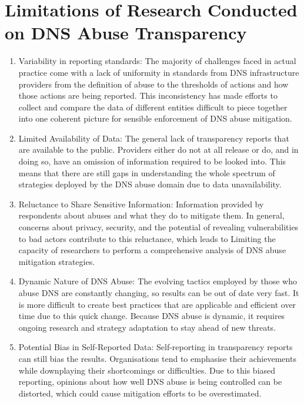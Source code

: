 \section{Limitations of Research Conducted on DNS Abuse Transparency }

\begin{enumerate}
    \item Variability in reporting standards: The majority of challenges faced in actual practice come with a lack of uniformity in standards from DNS infrastructure providers from the definition of abuse to the thresholds of actions and how those actions are being reported. This inconsistency has made efforts to collect and compare the data of different entities difficult to piece together into one coherent picture for sensible enforcement of DNS abuse mitigation. 

    \item Limited Availability of Data: The general lack of transparency reports that are available to the public. Providers either do not at all release or do, and in doing so, have an omission of information required to be looked into. This means that there are still gaps in understanding the whole spectrum of strategies deployed by the DNS abuse domain due to data unavailability. 
    
    \item Reluctance to Share Sensitive Information: Information provided by respondents about abuses and what they do to mitigate them. In general, concerns about privacy, security, and the potential of revealing vulnerabilities to bad actors contribute to this reluctance, which leads to Limiting the capacity of researchers to perform a comprehensive analysis of DNS abuse mitigation strategies.
    
    \item Dynamic Nature of DNS Abuse: The evolving tactics employed by those who abuse DNS are constantly changing, so results can be out of date very fast. It is more difficult to create best practices that are applicable and efficient over time due to this quick change. Because DNS abuse is dynamic, it requires ongoing research and strategy adaptation to stay ahead of new threats.

    \item Potential Bias in Self-Reported Data: Self-reporting in transparency reports can still bias the results. Organisations tend to emphasise their achievements while downplaying their shortcomings or difficulties. Due to this biased reporting, opinions about how well DNS abuse is being controlled can be distorted, which could cause mitigation efforts to be overestimated.
    

\end{enumerate}
